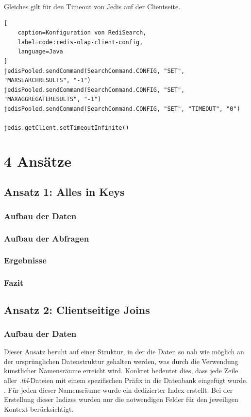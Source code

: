 Gleiches gilt für den Timeout von Jedis auf der Clientseite.
\begin{lstlisting}[
    caption=Konfiguration von RediSearch,
    label=code:redis-olap-client-config,
    language=Java
]
jedisPooled.sendCommand(SearchCommand.CONFIG, "SET", "MAXSEARCHRESULTS", "-1")
jedisPooled.sendCommand(SearchCommand.CONFIG, "SET", "MAXAGGREGATERESULTS", "-1")
jedisPooled.sendCommand(SearchCommand.CONFIG, "SET", "TIMEOUT", "0")

jedis.getClient.setTimeoutInfinite()
\end{lstlisting}

\section{4 Ansätze}
\subsection{Ansatz 1: Alles in Keys}
\subsubsection{Aufbau der Daten}
\subsubsection{Aufbau der Abfragen}
\subsubsection{Ergebnisse}
\subsubsection{Fazit}


\subsection{Ansatz 2: Clientseitige Joins}

\subsubsection{Aufbau der Daten}\label{sec:client-approach-datastructure}
Dieser Ansatz beruht auf einer Struktur, in der die Daten so nah wie möglich an der ursprünglichen Datenstruktur gehalten werden, was durch die Verwendung künstlicher Namensräume erreicht wird. Konkret bedeutet dies, dass jede Zeile aller \emph{.tbl}-Dateien mit einem spezifischen Präfix in die Datenbank eingefügt wurde. . Für jeden dieser Namensräume wurde ein dedizierter Index erstellt. Bei der Erstellung dieser Indizes wurden nur die notwendigen Felder für den jeweiligen Kontext berücksichtigt.

